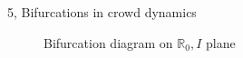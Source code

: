 \begin{task}{5, Bifurcations in crowd dynamics}
\begin{figure}[H]
\caption{Bifurcation diagram on $\mathbb{R}_0, I$ plane}
\label{fig:t5_7-R0}
\end{figure}

\end{task}